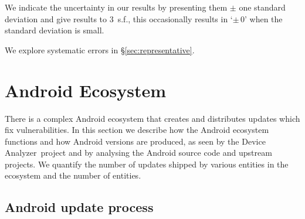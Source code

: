 \documentclass{sig-alternate}
\let\OldTodo\todo
\renewcommand{\todo}{\OldTodo[inline]}
\newcommand{\todolater}[1]{}%
\newcommand{\da}{Device Analyzer}
\begin{document}
We indicate the uncertainty in our results by presenting them $\pm$ one standard deviation and give results to 3~s.f., this occasionally results in `$\pm\, 0$' when the standard deviation is small.
\todolater{Do we want to use the 95 percentile instead}
We explore systematic errors in \S\ref{sec:representative}.

\section{Android Ecosystem}\label{sec:android_ecosystem}
There is a complex Android ecosystem that creates and distributes updates which fix vulnerabilities.
In this section we describe how the Android ecosystem functions and how Android versions are produced, as seen by the \da\ project and by analysing the Android source code and upstream projects.
We quantify the number of updates shipped by various entities in the ecosystem and the number of entities.


\subsection{Android update process}
\end{document}
